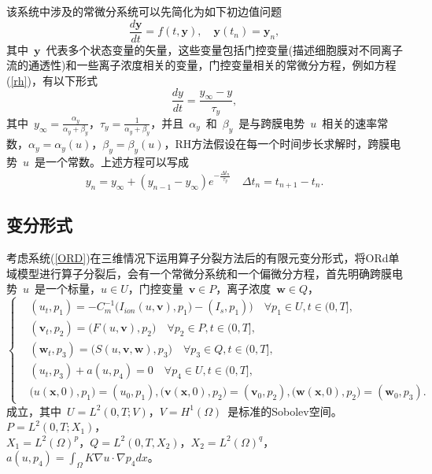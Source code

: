 \documentclass[twoside,UTF8]{nputhesis}
\begin{document}
该系统中涉及的常微分系统可以先简化为如下初边值问题
\begin{equation}
\frac{d\textbf{y}}{dt}=f(t,\textbf{y}),\quad \textbf{y}(t_n)=\textbf{y}_n,
\end{equation}
其中~$\textbf{y}$~代表多个状态变量的矢量，这些变量包括门控变量(描述细胞膜对不同离子流的通透性)和一些离子浓度相关的变量，门控变量相关的常微分方程，例如方程(\ref{rh})，有以下形式
\begin{equation}
\frac{dy}{dt}=\frac{y_\infty-y}{\tau_y},
\end{equation}
其中~$y_\infty=\frac{\alpha_y}{\alpha_y+\beta_y}$，$\tau_y=\frac{1}{\alpha_y+\beta_y}$，并且~$\alpha_y$~和~$\beta_y$~是与跨膜电势~$u$~相关的速率常数，$\alpha_y=\alpha_y(u)$，$\beta_y=\beta_y(u)$，RH方法假设在每一个时间步长求解时，跨膜电势~$u$~是一个常数。上述方程可以写成
\begin{equation}
y_n=y_\infty+(y_{n-1}-y_\infty)e^{-\frac{\Delta t_n}{\tau_y}} \quad \Delta t_n=t_{n+1}-t_n.
\end{equation}

\subsection{变分形式}
考虑系统(\ref{ORD})在三维情况下运用算子分裂方法后的有限元变分形式，将ORd单域模型进行算子分裂后，会有一个常微分系统和一个偏微分方程，首先明确跨膜电势~$u$~是一个标量，$u\in U$，门控变量~$\textbf{v}\in P$，离子浓度~$\textbf{w}\in Q$，
\begin{equation}
\left\{\begin{aligned}&(u_t,p_1)=-C_m^{-1}\big(I_{ion}(u,\textbf{v}),p_1)-(I_s,p_1)\big) \quad \forall  p_1\in U,  t\in(0,T],
\\&(\textbf{v}_t,p_2)=\big(F(u,\textbf{v}),p_2\big)\quad \forall p_2\in P, t\in(0,T],
\\&(\textbf{w}_t,p_3)=\big(S(u,\textbf{v},\textbf{w}),p_3\big)\quad \forall p_3\in Q, t\in(0,T],
\\&(u_t,p_3)+a(u,p_4)=0\quad \forall p_4\in U,t\in(0,T],
\\&\big(u(\textbf{x},0),p_1\big)=(u_0,p_1),\big(\textbf{v}(\textbf{x},0),p_2\big)=(\textbf{v}_0,p_2),\big(\textbf{w}(\textbf{x},0),p_2\big)=(\textbf{w}_0,p_3).
\end{aligned}\right.
\label{01}
\end{equation}
成立，其中~$U=L^2(0,T;V)$，$V=H^1(\Omega)$~是标准的Sobolev空间。$P=L^2(0,T;X_1)$，\\
$X_1=L^2(\Omega)^{p}$，$Q=L^2(0,T,X_2)$，$X_2=L^2(\Omega)^q$，$a(u,p_4)=\int_\Omega K\nabla u\cdot\nabla p_4dx$。
\end{document}
